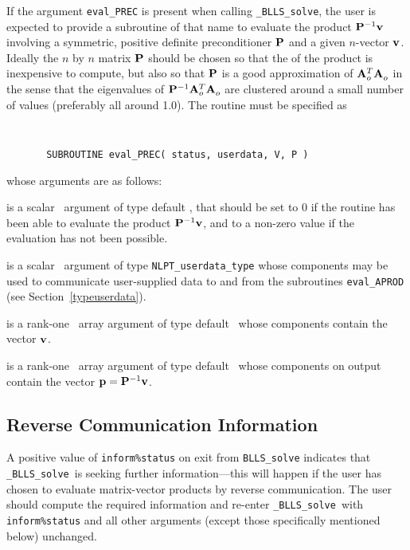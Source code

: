 \documentclass{galahad}
\newcommand{\packagename}{BLLS}
\newcommand{\fullpackagename}{\libraryname\_\packagename}
\newcommand{\solver}{{\tt \fullpackagename\_solve}}
\begin{document}
If the argument {\tt eval\_PREC} is present when calling \solver, the
user is expected to provide a subroutine of that name to evaluate the
product ${\mathbf{P}}^{-1} {\mathbf{v}}$ involving a symmetric, positive definite 
preconditioner ${\mathbf{P}}$ and a given $n$-vector ${\mathbf{v}}$.
Ideally the $n$ by $n$ matrix ${\mathbf{P}}$ should be chosen so that the
of the product is inexpensive to compute, but also so that ${\mathbf{P}}$ is
a good approximation of ${\mathbf{A}}_o^T {\mathbf{A}}_o^{}$ in the sense that the eigenvalues
of ${\mathbf{P}}^{-1} {\mathbf{A}}_o^T {\mathbf{A}}_o^{}$ are clustered around a small number of values
(preferably all around 1.0). The routine must be specified as

\def\baselinestretch{0.8}
{\tt
\begin{verbatim}
       SUBROUTINE eval_PREC( status, userdata, V, P )
\end{verbatim} }
\def\baselinestretch{1.0}
\noindent whose arguments are as follows:

\begin{description}
 is a scalar \intentout\ argument of type default \integer,
that should be set to 0 if the routine has been able to evaluate the
product ${\mathbf{P}}^{-1} {\mathbf{v}}$, 
and to a non-zero value if the evaluation has not been possible.

 is a scalar \intentinout\ argument of type
{\tt NLPT\_userdata\_type} whose components may be used
to communicate user-supplied data to and from the subroutines
{\tt eval\_APROD}
(see Section~\ref{typeuserdata}).

 is a rank-one \intentin\ array argument of type default \realdp\
whose components contain the vector ${\mathbf{v}}$.

 is a rank-one \intentinout\ array argument of type default \realdp\
whose components on output contain the vector ${\mathbf{p}} = {\mathbf{P}}^{-1} {\mathbf{v}}$.

\end{description}



\subsection{\label{reverse}Reverse Communication Information}

A positive value of {\tt inform\%status} on exit from
{\tt \packagename\_solve}
indicates that
\solver\ is seeking further information---this will happen
if the user has chosen to evaluate matrix-vector products by
reverse communication.
The user should compute the required information and re-enter \solver\
with {\tt inform\%status} and all other arguments (except those specifically
mentioned below) unchanged.
\end{document}
